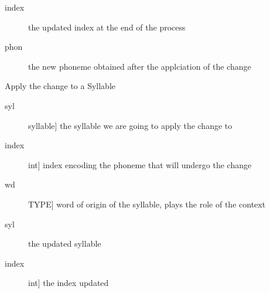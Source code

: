 \documentclass[letterpaper,10pt,english]{sphinxmanual}
\begin{document}
\begin{fulllineitems}
\begin{fulllineitems}
\begin{description}
\end{description}
\begin{description}
\item[{index}] \leavevmode
\sphinxAtStartPar
the updated index at the end of the process

\item[{phon }] \leavevmode
\sphinxAtStartPar
the new phoneme obtained after the applciation of the change

\end{description}

\end{fulllineitems}


\begin{fulllineitems}
\label{\detokenize{index:Change.P_change.apply_syl}}
\sphinxAtStartPar
Apply the change to a Syllable
\begin{description}
\item[{syl}] \leavevmode{[}syllable{]}
\sphinxAtStartPar
the syllable we are going to apply the change to

\item[{index}] \leavevmode{[}int{]}
\sphinxAtStartPar
index encoding the phoneme that will undergo the change

\item[{wd}] \leavevmode{[}TYPE{]}
\sphinxAtStartPar
word of origin of the syllable, plays the role of the context

\end{description}
\begin{description}
\item[{syl}] \leavevmode{[}{]}
\sphinxAtStartPar
the updated syllable

\item[{index}] \leavevmode{[}int{]}
\sphinxAtStartPar
the index updated

\end{description}

\end{fulllineitems}



\end{fulllineitems}
\end{document}

